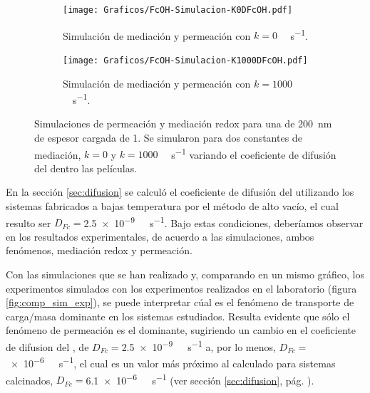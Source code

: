 				\begin{figure}[h!]
				\begin{subfigure}[t]{0.495\textwidth}
					\centering
			 	    \texttt{[image: Graficos/FcOH-Simulacion-K0DFcOH.pdf]}
			        \vspace*{-4mm}
			        \caption{Simulación de mediación y permeación con $k=0$ \si{\per\Molar\per\second}.}
			        \label{fig:sim_med_k0}
			      	\end{subfigure}
				\begin{subfigure}[t]{0.495\textwidth}
					\centering
			 	    \texttt{[image: Graficos/FcOH-Simulacion-K1000DFcOH.pdf]}
			        \vspace*{-4mm}
			        \caption{Simulación de mediación y permeación con $k=1000$ \si{\per\Molar\per\second}.}
			        \label{fig:sim_med_1000}
			      	\end{subfigure}
			      	\vspace*{-1mm}
			      	\caption[Simulación EQ de mediación/permeación]{Simulaciones de permeación y mediación redox para una \pdm\space de \SI{200}{nm} de espesor cargada de \ru\space \SI{1}{\Molar}. Se simularon para dos constantes de mediación, $k=0$ y $k=1000$ \si{\per\Molar\per\second} variando el coeficiente de difusión del \fc\space dentro las películas.}
			      	\label{fig:sim_med_perm}
			      	\end{figure}
			  	

		En la sección \ref{sec:difusion} se calculó el coeficiente de difusión del \fc\space utilizando los sistemas fabricados a bajas temperatura por el método de alto vacío, el cual resulto ser $D_{Fc}\!\!=$\SI{2.5e-9}{\per\Molar\per\second}. Bajo estas condiciones, deberíamos observar en los resultados experimentales, de acuerdo a las simulaciones, ambos fenómenos, mediación redox y permeación. 
						
		
	   	Con las simulaciones que se han realizado y, comparando en un mismo gráfico, los experimentos simulados con los experimentos realizados en el laboratorio (figura \ref{fig:comp_sim_exp}), se puede interpretar cúal es el fenómeno de transporte de carga/masa dominante en los sistemas estudiados. Resulta evidente que sólo el fenómeno de permeación es el dominante, sugiriendo un cambio en el coeficiente de difusion del \fc, de $D_{Fc}\!=$\SI{2.5e-9}{\per\Molar\per\second} a, por lo menos, $D_{Fc}\!=$\SI{e-6}{\per\Molar\per\second}, el cual es un valor más próximo al calculado para sistemas calcinados, $D_{Fc}\!=$\SI{6.1e-6}{\per\Molar\per\second} (ver sección \ref{sec:difusion}, pág. \pageref{sec:difusion}). 

